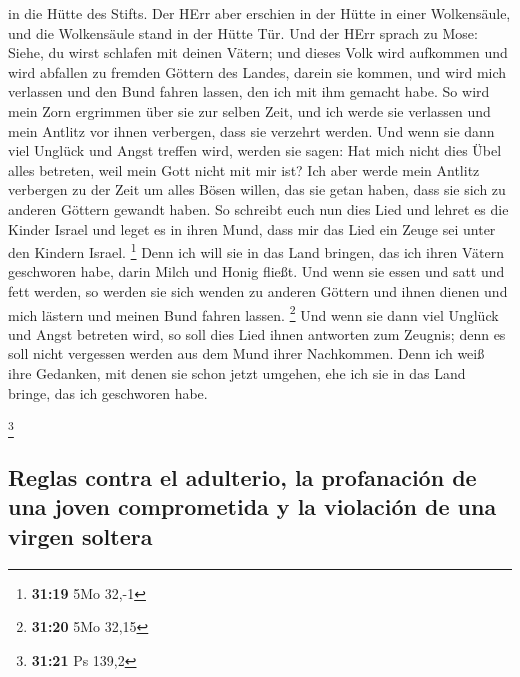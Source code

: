 in die Hütte des Stifts.  Der HErr aber erschien in der
Hütte in einer Wolkensäule, und die Wolkensäule stand in der Hütte Tür.
 Und der HErr sprach zu Mose: Siehe, du wirst schlafen
mit deinen Vätern; und dieses Volk wird aufkommen und wird abfallen zu
fremden Göttern des Landes, darein sie kommen, und wird mich verlassen
und den Bund fahren lassen, den ich mit ihm gemacht habe.
 So wird mein Zorn ergrimmen über sie zur selben Zeit,
und ich werde sie verlassen und mein Antlitz vor ihnen verbergen, dass
sie verzehrt werden. Und wenn sie dann viel Unglück und Angst treffen
wird, werden sie sagen: Hat mich nicht dies Übel alles betreten, weil
mein Gott nicht mit mir ist?  Ich aber werde mein Antlitz
verbergen zu der Zeit um alles Bösen willen, das sie getan haben, dass
sie sich zu anderen Göttern gewandt haben.  So schreibt
euch nun dies Lied und lehret es die Kinder Israel und leget es in ihren
Mund, dass mir das Lied ein Zeuge sei unter den Kindern Israel.
\footnote{\textbf{31:19} 5Mo 32,-1}  Denn ich will sie in
das Land bringen, das ich ihren Vätern geschworen habe, darin Milch und
Honig fließt. Und wenn sie essen und satt und fett werden, so werden sie
sich wenden zu anderen Göttern und ihnen dienen und mich lästern und
meinen Bund fahren lassen. \footnote{\textbf{31:20} 5Mo 32,15}
 Und wenn sie dann viel Unglück und Angst betreten wird,
so soll dies Lied ihnen antworten zum Zeugnis; denn es soll nicht
vergessen werden aus dem Mund ihrer Nachkommen. Denn ich weiß ihre
Gedanken, mit denen sie schon jetzt umgehen, ehe ich sie in das Land
bringe, das ich geschworen habe.

\footnote{\textbf{31:21} Ps 139,2}

\hypertarget{reglas-contra-el-adulterio-la-profanaciuxf3n-de-una-joven-comprometida-y-la-violaciuxf3n-de-una-virgen-soltera}{%
\subsection{Reglas contra el adulterio, la profanación de una joven
comprometida y la violación de una virgen
soltera}\label{reglas-contra-el-adulterio-la-profanaciuxf3n-de-una-joven-comprometida-y-la-violaciuxf3n-de-una-virgen-soltera}}

